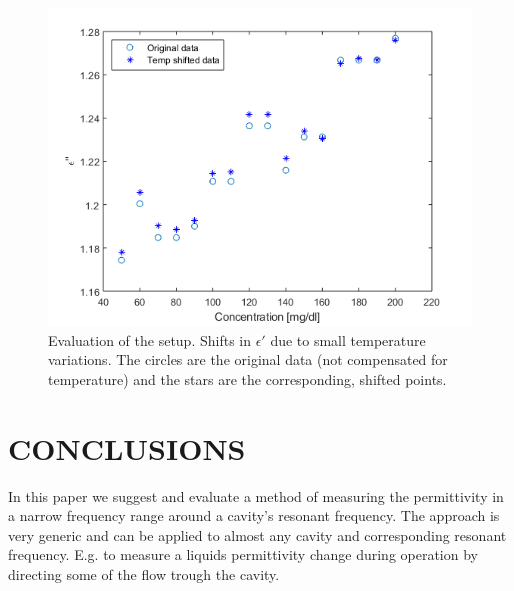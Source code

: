 \documentclass[10pt,final,conference,a4paper,twocolumn]{IEEEtran_AntennEMB_GigaHertz2016}
\begin{document}
\begin{figure}[t]
	\centering
	\includegraphics[width=1.0\columnwidth]{pumpgluzoomEIM.png}
	\caption{Evaluation of the setup. Shifts in $\epsilon'$ due to small temperature variations. The circles are the original data (not compensated for temperature) and the stars are the corresponding, shifted points.}
	\label{fig:eim}
\end{figure}





\section{CONCLUSIONS}
In this paper we suggest and evaluate a method of measuring the permittivity in a narrow frequency range around a cavity's resonant frequency. The approach is very generic and can be applied to almost any cavity and corresponding resonant frequency. E.g. to measure a liquids permittivity change during operation by directing some of the flow trough the cavity.
\end{document}
